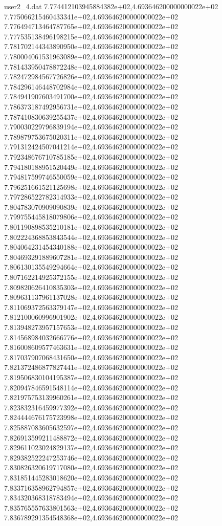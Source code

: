 \begin{filecontents}{user2_4.dat}
7.774412103945884382e+02,4.693646200000000022e+02
7.775066215460433341e+02,4.693646200000000022e+02
7.776494713464787765e+02,4.693646200000000022e+02
7.777535138496198215e+02,4.693646200000000022e+02
7.781702144343890950e+02,4.693646200000000022e+02
7.780004061531963089e+02,4.693646200000000022e+02
7.781433950478872248e+02,4.693646200000000022e+02
7.782472984567726826e+02,4.693646200000000022e+02
7.784296146448702984e+02,4.693646200000000022e+02
7.784941907603491700e+02,4.693646200000000022e+02
7.786373187492956731e+02,4.693646200000000022e+02
7.787410830639255437e+02,4.693646200000000022e+02
7.790030229796839194e+02,4.693646200000000022e+02
7.789879753675020311e+02,4.693646200000000022e+02
7.791312424507041214e+02,4.693646200000000022e+02
7.792348676710785185e+02,4.693646200000000022e+02
7.794180188951520449e+02,4.693646200000000022e+02
7.794817599746550059e+02,4.693646200000000022e+02
7.796251661521125698e+02,4.693646200000000022e+02
7.797286522782314933e+02,4.693646200000000022e+02
7.804783070909090839e+02,4.693646200000000022e+02
7.799755445818079806e+02,4.693646200000000022e+02
7.801190898535210181e+02,4.693646200000000022e+02
7.802224368853843544e+02,4.693646200000000022e+02
7.804064231454340188e+02,4.693646200000000022e+02
7.804693291889607281e+02,4.693646200000000022e+02
7.806130135549294664e+02,4.693646200000000022e+02
7.807162214925372155e+02,4.693646200000000022e+02
7.809820626410835303e+02,4.693646200000000022e+02
7.809631137961137028e+02,4.693646200000000022e+02
7.811069372563379147e+02,4.693646200000000022e+02
7.812100060996901902e+02,4.693646200000000022e+02
7.813948273957157653e+02,4.693646200000000022e+02
7.814568984032666776e+02,4.693646200000000022e+02
7.816008609577463631e+02,4.693646200000000022e+02
7.817037907068431650e+02,4.693646200000000022e+02
7.821372486877827441e+02,4.693646200000000022e+02
7.819506830104195387e+02,4.693646200000000022e+02
7.820947846591548114e+02,4.693646200000000022e+02
7.821975753139960261e+02,4.693646200000000022e+02
7.823832316459977392e+02,4.693646200000000022e+02
7.824444676175723998e+02,4.693646200000000022e+02
7.825887083605632597e+02,4.693646200000000022e+02
7.826913599211488872e+02,4.693646200000000022e+02
7.829611023024829137e+02,4.693646200000000022e+02
7.829382522247253746e+02,4.693646200000000022e+02
7.830826320619717080e+02,4.693646200000000022e+02
7.831851445283018620e+02,4.693646200000000022e+02
7.833716358962794857e+02,4.693646200000000022e+02
7.834320368318783494e+02,4.693646200000000022e+02
7.835765557633801563e+02,4.693646200000000022e+02
7.836789291354548368e+02,4.693646200000000022e+02

\end{filecontents}
